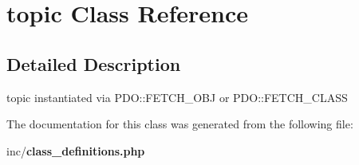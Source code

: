 \section{topic Class Reference}
\label{classtopic}


\subsection{Detailed Description}
topic instantiated via P\+D\+O\+::\+F\+E\+T\+C\+H\+\_\+\+O\+BJ or P\+D\+O\+::\+F\+E\+T\+C\+H\+\_\+\+C\+L\+A\+SS 

The documentation for this class was generated from the following file\+:\begin{DoxyCompactItemize}
\item 
inc/{\bf class\+\_\+definitions.\+php}\end{DoxyCompactItemize}
